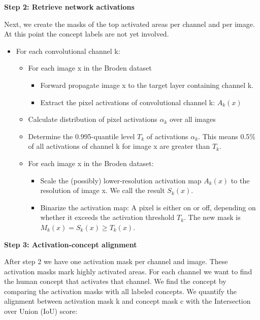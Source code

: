 \documentclass[
  12pt,
]{krantz}
\providecommand{\tightlist}{%
  \setlength{\itemsep}{0pt}\setlength{\parskip}{0pt}}
\begin{document}
\textbf{Step 2: Retrieve network activations}

Next, we create the masks of the top activated areas per channel and per image.
At this point the concept labels are not yet involved.

\begin{itemize}
\tightlist
\item
  For each convolutional channel k:

  \begin{itemize}
  \tightlist
  \item
    For each image x in the Broden dataset

    \begin{itemize}
    \tightlist
    \item
      Forward propagate image x to the target layer containing channel k.
    \item
      Extract the pixel activations of convolutional channel k: \(A_k(x)\)
    \end{itemize}
  \item
    Calculate distribution of pixel activations \(\alpha_k\) over all images
  \item
    Determine the 0.995-quantile level \(T_k\) of activations \(\alpha_k\). This means 0.5\% of all activations of channel k for image x are greater than \(T_k\).
  \item
    For each image x in the Broden dataset:

    \begin{itemize}
    \tightlist
    \item
      Scale the (possibly) lower-resolution activation map \(A_k(x)\) to the resolution of image x. We call the result \(S_k(x)\).
    \item
      Binarize the activation map: A pixel is either on or off, depending on whether it exceeds the activation threshold \(T_k\). The new mask is \(M_k(x)=S_k(x)\geq{}T_k(x)\).
    \end{itemize}
  \end{itemize}
\end{itemize}

\textbf{Step 3: Activation-concept alignment}

After step 2 we have one activation mask per channel and image.
These activation masks mark highly activated areas.
For each channel we want to find the human concept that activates that channel.
We find the concept by comparing the activation masks with all labeled concepts.
We quantify the alignment between activation mask k and concept mask c with the Intersection over Union (IoU) score:
\end{document}
